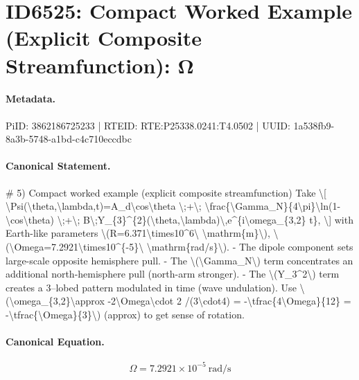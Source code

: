 \section*{ID6525: Compact Worked Example (Explicit Composite Streamfunction): Ω}
\paragraph{Metadata.}
PiID: 3862186725233 | RTEID: RTE:P25338.0241:T4.0502 | UUID: 1a538fb9-8a3b-5748-a1bd-c4c710eccdbc

\paragraph{Canonical Statement.}
\# 5) Compact worked example (explicit composite streamfunction) Take \textbackslash{}[ \textbackslash{}Psi(\textbackslash{}theta,\textbackslash{}lambda,t)=A\_d\textbackslash{}cos\textbackslash{}theta \textbackslash{};+\textbackslash{}; \textbackslash{}frac\{\textbackslash{}Gamma\_N\}\{4\textbackslash{}pi\}\textbackslash{}ln(1-\textbackslash{}cos\textbackslash{}theta) \textbackslash{};+\textbackslash{}; B\textbackslash{};Y\_\{3\}\textasciicircum{}\{2\}(\textbackslash{}theta,\textbackslash{}lambda)\textbackslash{},e\textasciicircum{}\{i\textbackslash{}omega\_\{3,2\} t\}, \textbackslash{}] with Earth-like parameters \textbackslash{}(R=6.371\textbackslash{}times10\textasciicircum{}6\textbackslash{} \textbackslash{}mathrm\{m\}\textbackslash{}), \textbackslash{}(\textbackslash{}Omega=7.2921\textbackslash{}times10\textasciicircum{}\{-5\}\textbackslash{} \textbackslash{}mathrm\{rad/s\}\textbackslash{}). - The dipole component sets large-scale opposite hemisphere pull. - The \textbackslash{}(\textbackslash{}Gamma\_N\textbackslash{}) term concentrates an additional north-hemisphere pull (north-arm stronger). - The \textbackslash{}(Y\_3\textasciicircum{}2\textbackslash{}) term creates a 3–lobed pattern modulated in time (wave undulation). Use \textbackslash{}(\textbackslash{}omega\_\{3,2\}\textbackslash{}approx -2\textbackslash{}Omega\textbackslash{}cdot 2 /(3\textbackslash{}cdot4) = -\textbackslash{}tfrac\{4\textbackslash{}Omega\}\{12\} = -\textbackslash{}tfrac\{\textbackslash{}Omega\}\{3\}\textbackslash{}) (approx) to get sense of rotation.

\paragraph{Canonical Equation.}
\[
\Omega=7.2921\times10^{-5}\ \mathrm{rad/s}
\]

